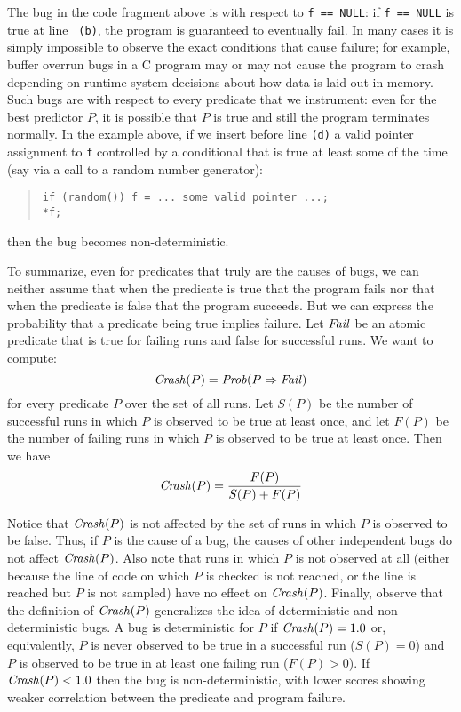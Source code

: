 The bug in the code fragment above is  with
respect to {\tt f == NULL}: if {\tt f == NULL} is true at line {\tt
(b)}, the program is guaranteed to eventually fail.  In many cases it
is simply impossible to observe the exact conditions that cause
failure; for example, buffer overrun bugs in a C program may or may
not cause the program to crash depending on runtime system decisions
about how data is laid out in memory.  Such bugs are
 with respect to every predicate that we instrument:
even for the best predictor $P$, it is possible that $P$ is true and
still the program terminates normally.  In the example above, if we insert before line
{\tt (d)} a valid pointer  assignment to {\tt f} controlled by a conditional that is true
at least some of the time (say via a call to a random number generator):
\begin{quote}
\begin{verbatim}
if (random()) f = ... some valid pointer ...;
*f;
\end{verbatim}
\end{quote}
then the bug becomes non-deterministic.

To summarize, even for predicates that truly are the causes of bugs, we can neither assume that
when the predicate is true that
the program fails nor that when the predicate is false that
the program succeeds. But we can express the probability that a predicate
being true implies failure.  Let $\mbox{\textit{Fail}}$ be an atomic predicate that is
true for failing runs and false for successful runs.  We want to compute:
\[ \mbox{\textit{Crash}}(P) = \mbox{\textit{Prob}}(P \Rightarrow \mbox{\textit{Fail}}) \]
for every predicate $P$ over the set of all runs.  Let $S(P)$ be the number
of successful runs in which $P$ is observed to be true at least once, and let $F(P)$ be the number of
failing runs in which $P$ is observed to be true at least once.  Then we have
\[ \mbox{\textit{Crash}}(P) = \frac{F(P)}{S(P) + F(P)} \]

Notice that $\mbox{\textit{Crash}}(P)$ is not affected by the set of runs in which
$P$ is observed to be false.  Thus, if $P$ is the cause of a bug, the
causes of other independent bugs do not affect $\mbox{\textit{Crash}}(P)$.
Also note that runs in which $P$ is not observed at all (either because
the line of code on which $P$ is checked is not reached, or the line is reached
but $P$ is not sampled) have no effect on $\mbox{\textit{Crash}}(P)$.
Finally, observe that the definition of $\mbox{\textit{Crash}}(P)$
generalizes the idea of deterministic and non-deterministic bugs.  A
bug is deterministic for $P$ if $\mbox{\textit{Crash}}(P) = 1.0$ or, equivalently,
$P$ is never observed to be true in a successful run ($S(P) =
0$) and $P$ is observed to be true in at least one failing run ($F(P) > 0$).
If $\mbox{\textit{Crash}}(P) < 1.0$ then the bug is non-deterministic, with
lower scores showing weaker correlation between the predicate and
program failure.

